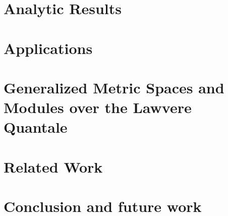\documentclass[conference]{IEEEtran}
\begin{document}
\section{Analytic Results}
%


\section{Applications}
%


\section{Generalized Metric Spaces and Modules over the Lawvere Quantale}\label{sec:QMod}
%


\section{Related Work}



\section{Conclusion and future work}

\end{document}

